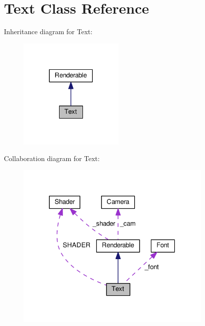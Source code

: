 \hypertarget{class_text}{}\section{Text Class Reference}
\label{class_text}


Inheritance diagram for Text\+:\nopagebreak
\begin{figure}[H]
\begin{center}
\leavevmode
\includegraphics[width=146pt]{class_text__inherit__graph}
\end{center}
\end{figure}


Collaboration diagram for Text\+:\nopagebreak
\begin{figure}[H]
\begin{center}
\leavevmode
\includegraphics[width=273pt]{class_text__coll__graph}
\end{center}
\end{figure}
